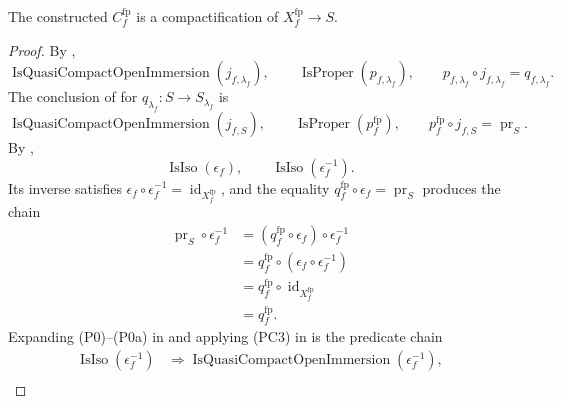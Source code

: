 \begin{lemma}
  \label{lemma:nagata-final-basechanged-compactification}
\checked
  The constructed $C_f^{\mathrm{fp}}$ is a compactification of
  $X_f^{\mathrm{fp}}\to S$.
\end{lemma}

\begin{proof}
\checked
  By ,
  \[
    \operatorname{IsQuasiCompactOpenImmersion}(j_{f,\lambda_f}),
    \qquad
    \operatorname{IsProper}(p_{f,\lambda_f}),
    \qquad
    p_{f,\lambda_f}\circ j_{f,\lambda_f}=q_{f,\lambda_f}.
  \]
  The conclusion of  for
  $q_{\lambda_f}\colon S\to S_{\lambda_f}$ is
  \[
    \operatorname{IsQuasiCompactOpenImmersion}(j_{f,S}),
    \qquad
    \operatorname{IsProper}(p_f^{\mathrm{fp}}),
    \qquad
    p_f^{\mathrm{fp}}\circ j_{f,S}=\operatorname{pr}_S.
  \]
  By ,
  \[
    \operatorname{IsIso}(\epsilon_f),
    \qquad
    \operatorname{IsIso}(\epsilon_f^{-1}).
  \]
  Its inverse satisfies
  $\epsilon_f\circ\epsilon_f^{-1}
    =\operatorname{id}_{X_f^{\mathrm{fp}}}$, and the equality
  $q_f^{\mathrm{fp}}\circ\epsilon_f=\operatorname{pr}_S$ produces the chain
  \[
  \begin{aligned}
    \operatorname{pr}_S\circ\epsilon_f^{-1}
      &=(q_f^{\mathrm{fp}}\circ\epsilon_f)
        \circ\epsilon_f^{-1}\\
      &=q_f^{\mathrm{fp}}\circ
        (\epsilon_f\circ\epsilon_f^{-1})\\
      &=q_f^{\mathrm{fp}}\circ
        \operatorname{id}_{X_f^{\mathrm{fp}}}\\
      &=q_f^{\mathrm{fp}}.
  \end{aligned}
  \]
  Expanding (P0)--(P0a) in
   and applying (PC3) in
   is the predicate chain
  \[
  \begin{aligned}
    \operatorname{IsIso}(\epsilon_f^{-1})
      &\Longrightarrow
        \operatorname{IsQuasiCompactOpenImmersion}(\epsilon_f^{-1}),\\

\end{aligned}\]
\end{proof}
